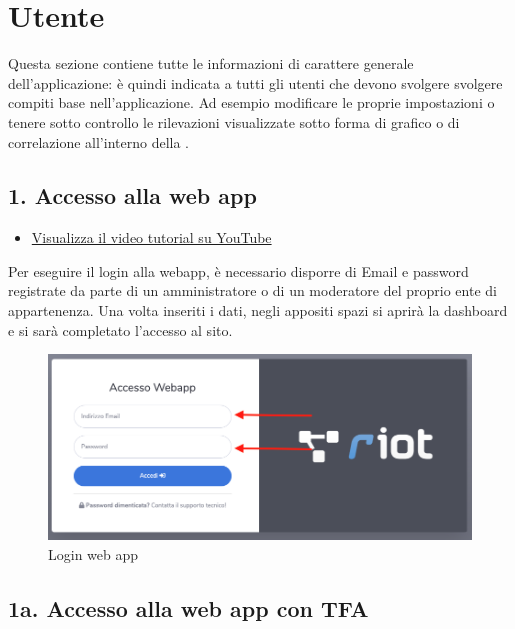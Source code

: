 \section{Utente}
Questa sezione contiene tutte le informazioni di carattere generale dell'applicazione: è quindi indicata a tutti gli utenti che devono svolgere svolgere compiti base nell'applicazione. Ad esempio modificare le proprie impostazioni o tenere sotto controllo le rilevazioni visualizzate sotto forma di grafico o di correlazione all'interno della .

\subsection{1. Accesso alla web app}

	\begin{itemize}
		\item \href{https://www.youtube.com/watch?v=PjySMOLCtMA&list=PLPKYjnuIh1FA3b3jn_bwY_ztYzaFn2mIT&index=1}{Visualizza il video tutorial su YouTube} 
	\end{itemize}
	Per eseguire il login alla webapp, è necessario disporre di Email e password registrate da parte di un amministratore o di un moderatore del proprio ente di appartenenza. Una volta inseriti i dati, negli appositi spazi si aprirà la dashboard e si sarà completato l'accesso al sito.

	\begin{figure}[H]
		\centering
		\includegraphics[scale=0.450]{res/images/membro/login.png}
		\caption{Login web app}
	\end{figure}

\newpage \subsection{1a. Accesso alla web app con TFA}
	
